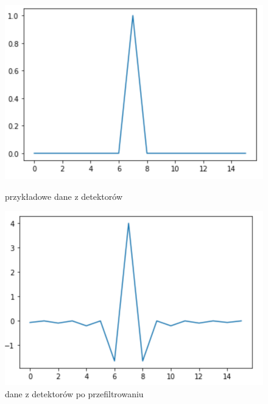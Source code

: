 \documentclass[polish,polish,a4paper]{article}
\begin{document}
					\begin{figure}[!h]
						\centering
						\begin{minipage}{0.45\linewidth}
							\includegraphics[width=\linewidth]{img/filtr_1.png}
							\caption{przykładowe dane z detektorów}
						\end{minipage}
						\hfill
						\begin{minipage}{0.45\linewidth}
							\includegraphics[width=\linewidth]{img/filtr_2.png}
							\caption{dane z detektorów po przefiltrowaniu}
						\end{minipage}
					\end{figure}
			
			
\end{document}
